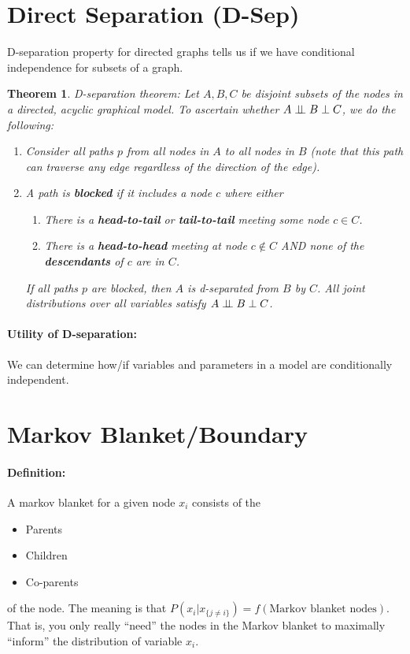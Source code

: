 \documentclass[a4paper,12pt]{report}
\newtheorem{theorem}{Theorem}
\begin{document}
\section{Direct Separation (D-Sep)}

D-separation property for directed graphs tells us if we have conditional independence for subsets of a graph.

\begin{theorem}{D-separation theorem: }
Let $A,B,C$ be disjoint subsets of the nodes in a directed, acyclic graphical model.  To ascertain whether $A \perp\!\!\!\perp B \perp C$, we do the following:
\begin{enumerate}
\item Consider all paths $p$ from all nodes in $A$ to all nodes in $B$ (note that this path can traverse any edge regardless of the direction of the edge).
\item A path is \textbf{blocked} if it includes a node $c$ where either
\begin{enumerate}
\item There is a \textbf{head-to-tail} or \textbf{tail-to-tail} meeting some node $c\in C$.
\item There is a \textbf{head-to-head} meeting at node $c\notin C$ AND none of the \textbf{descendants} of $c$ are in $C$.
\end{enumerate}

If all paths $p$ are blocked, then $A$ is d-separated from $B$ by $C$. All joint distributions over all variables satisfy $A \perp\!\!\!\perp B \perp C$.
\end{enumerate}
\end{theorem}

\paragraph{Utility of D-separation: } We can determine how/if variables and parameters in a model are conditionally independent.


\section{Markov Blanket/Boundary}

\paragraph{Definition: } A markov blanket for a given node $x_i$ consists of the 
\begin{itemize}
\item Parents
\item Children
\item Co-parents
\end{itemize}
of the node. The meaning is that $P(x_i|x_{\{j\neq i\}}) = f(\text{Markov blanket nodes})$. That is, you only really ``need'' the nodes in the Markov blanket to maximally ``inform'' the distribution of variable $x_i$.
\end{document}
